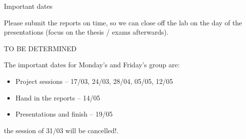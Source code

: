 \documentclass[11pt,t]{beamer}
\begin{document}
\begin{frame}{Important dates}

Please submit the reports on time, so we can close off the lab on the day of the presentations (focus on the thesis / exams afterwards).

\vspace{6mm}

TO BE DETERMINED

The important dates for {\color{olive}Monday's} and {\color{Plum}Friday's} group are:
\vspace{2mm}
\begin{itemize}\setlength\itemsep{0.75em}
    \item Project sessions -- {\color{olive}17/03, 24/03, 28/04, 05/05, 12/05}
    \item Hand in the reports -- {\color{olive}14/05}
    \item Presentations and finish -- {\color{olive}19/05} 
\end{itemize}

\vspace{4mm}

{\footnotesize the session of 31/03 will be cancelled!.}

\end{frame}
\end{document}
